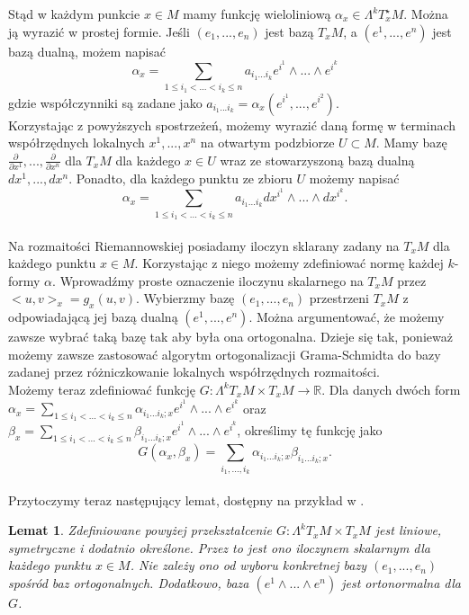 \documentclass[licencjacka]{pracamgr}
\theoremstyle{definition}
\theoremstyle{definition}
\theoremstyle{plain}
\newtheorem{lemma}{Lemat}[section]
\theoremstyle{plain}
\begin{document}
Stąd w każdym punkcie $x \in M$ mamy funkcję wieloliniową $\alpha_x \in
\Lambda^k T_x^\star M$. Można ją wyrazić w prostej formie.
Jeśli $(e_1, ..., e_n)$ jest bazą $T_x M$, a  $(e^1, ..., e^n)$ jest bazą dualną,
możem napisać
\[
    \alpha_x = \sum_{1 \leq i_1 < ... < i_k \leq n} a_{i_1 ... i_k} e^{i^1} \wedge ...
    \wedge e^{i^k}
\] 
gdzie współczynniki są zadane jako
$a_{i_1 ... i_k} = \alpha_x(e^{i^1}, ..., e^{i^2})$. \\

Korzystając z powyższych spostrzeżeń, możemy wyrazić daną formę w terminach
współrzędnych lokalnych $x^1, ..., x^n$
na otwartym podzbiorze $U \subset M$.  Mamy bazę
$\frac{\partial}{\partial x^1}, ..., \frac{\partial}{\partial x^n}$ dla $T_x M$
dla każdego $x \in U$ wraz ze stowarzyszoną bazą dualną $dx^1, ..., dx^n$.
Ponadto, dla każdego punktu ze zbioru $U$ możemy napisać
\[
    \alpha_x = \sum_{1 \leq i_1 < ... < i_k \leq n} a_{i_1 ... i_k}
       dx^{i^1} \wedge ...  \wedge dx^{i^k}.
\]  \\

Na rozmaitości Riemannowskiej posiadamy iloczyn sklarany zadany na 
$T_x M$ dla każdego punktu $x \in M$.
Korzystając z niego możemy zdefiniować normę każdej $k$-formy $\alpha$.
Wprowadźmy proste oznaczenie iloczynu skalarnego na
$T_x M$ przez $<u, v>_x = g_x(u, v)$. 
Wybierzmy bazę $(e_1, ..., e_n)$ przestrzeni $T_x M$ z odpowiadającą jej bazą dualną
$(e^1, ..., e^n)$.
Można argumentować, że możemy zawsze wybrać taką bazę tak aby była ona ortogonalna.
Dzieje się tak, ponieważ możemy zawsze zastosować algorytm ortogonalizacji 
Grama-Schmidta do bazy zadanej przez różniczkowanie lokalnych współrzędnych rozmaitości. \\

Możemy teraz zdefiniować funkcję $G: \Lambda^k T_x M \times T_x M \rightarrow \mathbb{R}$.
Dla danych dwóch form
$ \alpha_x = \sum_{1 \leq i_1 < ... < i_k \leq n} \alpha_{i_1 ... i_k; x} e^{i^1}
\wedge ...  \wedge e^{i^k}$ oraz
$ \beta_x = \sum_{1 \leq i_1 < ... < i_k \leq n} \beta_{i_1 ... i_k; x} e^{i^1}
\wedge ...  \wedge e^{i^k}$,  określimy tę funkcję jako
\[
    G(\alpha_x, \beta_x) = \sum_{i_1, ..., i_k} \alpha_{i_1 ... i_k; x}
                                                    \beta_{i_1 ... i_k; x}.
\] \\

Przytoczymy teraz następujący lemat, dostępny na przykład w \cite{lausanne}.


\begin{lemma}
    Zdefiniowane powyżej przekształcenie $G: \Lambda^k T_x M \times T_x M $ 
    jest liniowe, symetryczne i dodatnio określone. Przez to jest ono iloczynem
    skalarnym dla każdego punktu $x \in M$.  Nie zależy ono od wyboru konkretnej bazy
    $(e_1, ..., e_n)$ spośród baz ortogonalnych.  Dodatkowo, baza
    $(e^1 \wedge ... \wedge e^n)$ jest ortonormalna dla $G$.
\end{lemma}
\end{document}
